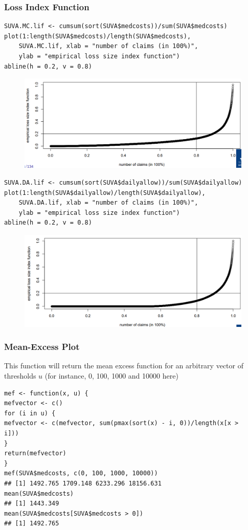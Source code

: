 \documentclass[11pt]{article}
\newcommand{\noi}{\noindent}
\begin{document}
\subsubsection{Loss Index Function}
\begin{lstlisting}
SUVA.MC.lif <- cumsum(sort(SUVA$medcosts))/sum(SUVA$medcosts)
plot(1:length(SUVA$medcosts)/length(SUVA$medcosts),
    SUVA.MC.lif, xlab = "number of claims (in 100%)",
    ylab = "empirical loss size index function")
abline(h = 0.2, v = 0.8)
\end{lstlisting}
\begin{figure}[H]
    \centering
    \includegraphics[width=0.7\linewidth]{SUVA - Loss Index Function - Med Costs.png}
\end{figure}

\begin{lstlisting}
SUVA.DA.lif <- cumsum(sort(SUVA$dailyallow))/sum(SUVA$dailyallow)
plot(1:length(SUVA$dailyallow)/length(SUVA$dailyallow),
    SUVA.DA.lif, xlab = "number of claims (in 100%)",
    ylab = "empirical loss size index function")
abline(h = 0.2, v = 0.8)
\end{lstlisting}
\begin{figure}[H]
    \centering
    \includegraphics[width=0.7\linewidth]{SUVA - Loss Index Function - Daily Allow.png}
\end{figure}

\subsubsection{Mean-Excess Plot}
\noi This function will return the mean excess function for an arbitrary vector of
thresholds $u$ (for instance, 0, 100, 1000 and 10000 here)
\begin{lstlisting}
mef <- function(x, u) {
mefvector <- c()
for (i in u) {
mefvector <- c(mefvector, sum(pmax(sort(x) - i, 0))/length(x[x >
i]))
}
return(mefvector)
}
mef(SUVA$medcosts, c(0, 100, 1000, 10000))
## [1] 1492.765 1709.148 6233.296 18156.631
mean(SUVA$medcosts)
## [1] 1443.349
mean(SUVA$medcosts[SUVA$medcosts > 0])
## [1] 1492.765
\end{lstlisting}
\end{document}
